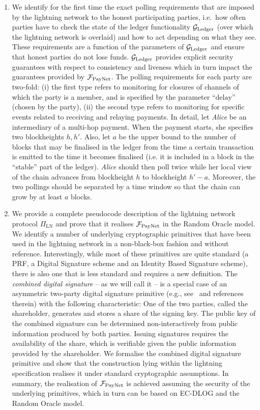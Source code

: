 \begin{enumerate}
\item We identify for the first time the exact polling requirements that are
imposed by the lightning network to the honest participating parties, i.e.\ how
often parties have to check the state of the ledger functionality $\mathcal{G}_{\mathrm{Ledger}}$
(over which the lightning network is overlaid) and how to act depending on what
they see. These requirements are a function of the parameters of $\mathcal{G}_{\mathrm{Ledger}}$ and
ensure that honest parties do not lose funds. $\mathcal{G}_{\mathrm{Ledger}}$ provides explicit
security guarantees with respect to consistency and liveness which in turn
impact the guarantees provided by $\mathcal{F}_{\mathrm{PayNet}}{}$. The polling requirements for
each party are two-fold: (i) the
first type refers to monitoring for closures of channels of which the
party is a member, and is specified by the parameter ``$\mathrm{delay}$''
(chosen by the party), (ii) the second type refers to monitoring for
specific events related to receiving and relaying payments. In detail,
let \emph{Alice} be an intermediary of a multi-hop payment. When the payment
starts, she specifies two blockheights $h, h'$. Also, let $a$ be the upper bound
to the number of blocks that may be finalised in the ledger from the time a
certain transaction is emitted to the time it becomes finalised (i.e. it is
included in a block in the ``stable'' part of the ledger). \emph{Alice}
should then poll twice while her local view of the chain advances from
blockheight $h$ to blockheight $h' - a$. Moreover, the two pollings should be
separated by a time window so that the chain can grow by at least $a$
blocks.

\item We provide a complete pseudocode description of the lightning network
protocol $\Pi_{\mathrm{LN}}$ and prove that it realises $\mathcal{F}_{\mathrm{PayNet}}{}$ in
the Random Oracle model. We identify a number of underlying cryptographic
primitives that have been used in the lightning network in
a non-black-box fashion and without reference. Interestingly, while
most of these primitives are quite standard (a PRF, a Digital Signature
scheme and an Identity Based Signature scheme), there is also one that is less standard  and requires a new definition. The \emph{combined digital signature} -- as we
will call it -- is a special case of an asymmetric two-party digital
signature primitive (e.g., see~\cite{DBLP:conf/ndss/NicolosiKDM03} and
references therein) with the following characteristic: One of
the two parties, called the shareholder, generates and stores a share of the signing
key. The public key of the combined signature can be
determined non-interactively from public information produced by both
parties. Issuing signatures requires the availability of the share,
which is verifiable given the public information provided by the shareholder. We
formalise the combined digital signature primitive and show that the
construction lying within the lightning specification realises
it under standard cryptographic assumptions. In summary, the realisation of
$\mathcal{F}_{\mathrm{PayNet}}{}$ is achieved assuming the security of the underlying
primitives, which in turn can be based on EC-DLOG and the Random Oracle
model.


\end{enumerate}
